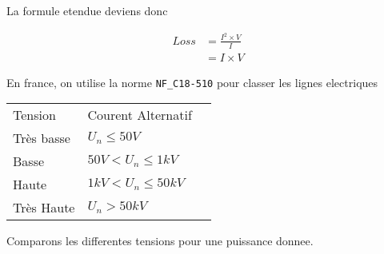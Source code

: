 La formule etendue deviens donc

\begin{equation} \label{loss}
  \begin{aligned}
    Loss & = \frac{I^2\times V}{I} \\
         & = I \times V
  \end{aligned}
\end{equation}

En france, on utilise la norme \texttt{NF\_C18-510} pour classer les lignes electriques

\begin{table}[]
  \begin{tabular}{lll}
  Tension    & Courent Alternatif     \\
  Très basse & $U_n \leq 50V$         \\
  Basse      & $50V < U_n \leq 1kV$   \\
  Haute      & $1kV < U_n \leq 50kV$  \\
  Très Haute & $U_n > 50kV$
\end{tabular}
\end{table}


Comparons les differentes tensions pour une puissance donnee.

\lipsum